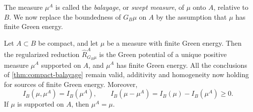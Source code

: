 The measure $\mu^A$ is called the \emph{balayage}, or \emph{swept measure}, of $\mu$ onto $A$, relative to $B$. We now replace the boundedness of $G_B\mu$ on $A$ by the assumption that $\mu$ has finite Green energy.

\begin{theorem}\label{thm:finite-energy-balayage}
Let $A\subset B$ be compact, and let $\mu$ be a measure with finite Green energy. Then the regularized reduction $\widehat R_{G_B\mu}^A$ is the Green potential of a unique positive measure $\mu^A$ supported on $A$, and $\mu^A$ has finite Green energy. All the conclusions of \cref{thm:compact-balayage} remain valid, additivity and homogeneity now holding for sources of finite Green energy. Moreover,
\[
 I_B(\mu,\mu^A)=I_B(\mu^A),\qquad
 I_B(\mu-\mu^A)=I_B(\mu)-I_B(\mu^A)\geq0.
\]
If $\mu$ is supported on $A$, then $\mu^A=\mu$.
\end{theorem}
